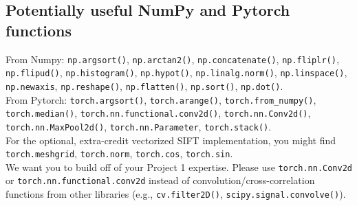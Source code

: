 \documentclass{article}
\begin{document}

\subsection*{Potentially useful NumPy and Pytorch functions}

From Numpy:
\lstinline{np.argsort()}, 
\lstinline{np.arctan2()},
\lstinline{np.concatenate()},
\lstinline{np.fliplr()}, \lstinline{np.flipud()},
\lstinline{np.histogram()},  
\lstinline{np.hypot()},
\lstinline{np.linalg.norm()},
\lstinline{np.linspace()},
\lstinline{np.newaxis},
\lstinline{np.reshape()},
\lstinline{np.flatten()},
\lstinline{np.sort()},
\lstinline{np.dot()}. \\

  
\noindent From Pytorch:
 \lstinline{torch.argsort()},
\lstinline{torch.arange()},
\lstinline{torch.from_numpy()},
\lstinline{torch.median()},
\lstinline{torch.nn.functional.conv2d()},
\lstinline{torch.nn.Conv2d()},
\lstinline{torch.nn.MaxPool2d()},
\lstinline{torch.nn.Parameter},
\lstinline{torch.stack()}. \\

\noindent For the optional, extra-credit vectorized SIFT implementation, you might find
\lstinline{torch.meshgrid},
\lstinline{torch.norm},
\lstinline{torch.cos},
\lstinline{torch.sin}. \\

\noindent We want you to build off of your Project 1 expertise. Please use \lstinline{torch.nn.Conv2d} or \lstinline{torch.nn.functional.conv2d} instead of convolution/cross-correlation functions from other libraries (e.g., \lstinline{cv.filter2D()},  \lstinline{scipy.signal.convolve()}).
\end{document}
